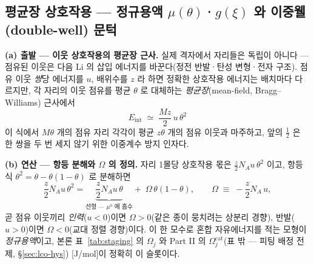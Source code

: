 \subsection{평균장 상호작용 --- 정규용액 $\mu(\theta)$·$g(\xi)$ 와 이중웰(double-well) 문턱}\label{sec:sm-mf}
\textbf{(a) 출발 --- 이웃 상호작용의 평균장 근사.} 실제 격자에서 자리들은 독립이 아니다 --- 점유된 이웃은 다음
Li 의 삽입 에너지를 바꾼다(정전 반발·탄성 변형·전자 구조). 점유 이웃 \emph{쌍}당 에너지를 $u$, 배위수를 $z$
라 하면 정확한 상호작용 에너지는 배치마다 다르지만, 각 자리의 이웃 점유를 평균 $\theta$ 로 대체하는
\emph{평균장}(mean-field, Bragg--Williams) 근사에서
\begin{equation}
E_\mathrm{int}\;\simeq\;\frac{Mz}{2}\,u\,\theta^2
\label{eq:sm-mf}
\end{equation}
이 식에서 $M\theta$ 개의 점유 자리 각각이 평균 $z\theta$ 개의 점유 이웃과 마주하고, 앞의 $\tfrac12$ 은 한 쌍을 두 번
세지 않기 위한 이중계수 방지 인자다.

\textbf{(b) 연산 --- 항등 분해와 $\Omega$ 의 정의.} 자리 1몰당 상호작용 몫은 $\tfrac{z}{2}N_Au\,\theta^2$ 이고,
항등식 $\theta^2=\theta-\theta(1-\theta)$ 로 분해하면
\begin{equation}
\frac{z}{2}N_Au\,\theta^2
=\underbrace{\frac{z}{2}N_Au\,\theta}_{\text{선형 --- }\mu^0\text{ 에 흡수}}
+\;\Omega\,\theta(1-\theta),
\qquad
\Omega\;\equiv\;-\frac{z}{2}N_A\,u,
\label{eq:sm-omega}
\end{equation}
곧 점유 이웃끼리 \emph{인력}($u<0$)이면 $\Omega>0$(같은 종이 뭉치려는 상분리 경향), 반발($u>0$)이면
$\Omega<0$(교대 정렬 경향)이다. 이 한 모수로 혼합 자유에너지를 적는 모형이
\emph{정규용액}이고, 본론 표~\ref{tab:staging} 의 $\Omega_j$ 와 Part II 의
$\Omega_j^\mathrm{cat}$(표 밖 --- 피팅 배정 전제, \S\ref{sec:lco-hys}) [J/mol]이 정확히 이 슬롯이다.

